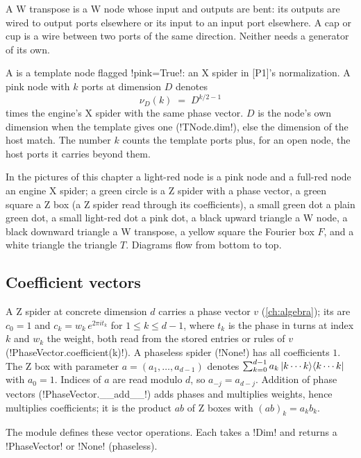 A W transpose is a W node whose input and outputs are bent: its outputs are wired to output
ports elsewhere or its input to an input port elsewhere. A cap or cup is a wire between two ports
of the same direction. Neither needs a generator of its own.

\begin{definition}\label{def:completeness-pink}
A  is a template node flagged \py!pink=True!: an X spider in [P1]'s
normalization. A pink node with $k$ ports at dimension $D$ denotes
\[
  \nu_D(k) \;=\; D^{k/2-1}
\]
times the engine's X spider with the same phase vector. $D$ is the node's own dimension when the
template gives one (\py!TNode.dim!), else the dimension of the host match. The number $k$ counts
the template ports plus, for an open node, the host ports it carries beyond them.
\end{definition}

In the pictures of this chapter a light-red node is a pink node and a full-red node an engine X
spider; a green circle is a Z spider with a phase vector, a green square a Z box (a Z spider
read through its coefficients), a small green dot a plain green dot, a small light-red dot a pink
dot, a black upward triangle a W node, a black downward triangle a W transpose, a yellow square
the Fourier box $F$, and a white triangle the triangle $T$. Diagrams flow from bottom to top.

\subsection{Coefficient vectors}\label{sec:completeness-vectors}

A Z spider at concrete dimension $d$ carries a phase vector $v$ (\cref{ch:algebra}); its
 are $c_0=1$ and $c_k=w_k\,e^{2\pi i t_k}$ for $1\le k\le d-1$, where $t_k$ is the
phase in turns at index $k$ and $w_k$ the weight, both read from the stored entries or rules of
$v$ (\py!PhaseVector.coefficient(k)!). A phaseless spider (\py!None!) has all coefficients $1$.
The Z box with parameter $a=(a_1,\dots,a_{d-1})$ denotes
$\sum_{k=0}^{d-1} a_k\,\lvert k\cdots k \rangle\langle k\cdots k \rvert$ with $a_0=1$. Indices of $a$ are read
modulo $d$, so $a_{-j}=a_{d-j}$. Addition of phase vectors (\py!PhaseVector.__add__!) adds
phases and multiplies weights, hence multiplies coefficients; it is the product $ab$ of Z boxes
with $(ab)_k=a_kb_k$.

The module defines these vector operations. Each takes a \py!Dim! and returns a
\py!PhaseVector! or \py!None! (phaseless).

